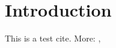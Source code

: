 \section{Introduction}

This is a test cite\cite{Ziemer_2012}. More: \cite{Izzo_2014}, \cite{gooding1990procedure}
